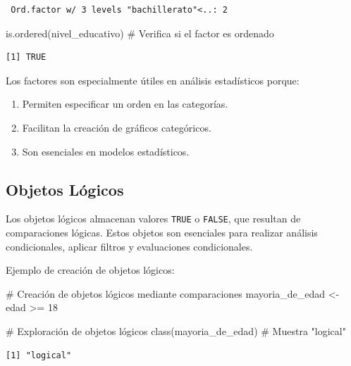 \documentclass[
  spanish,
  a4paper,
  DIV=11,
  numbers=noendperiod,
  onepage,
  openany]{scrreprt}
\newenvironment{Shaded}{\begin{snugshade}}{\end{snugshade}}
\newcommand{\CommentTok}[1]{\textcolor[rgb]{0.37,0.37,0.37}{#1}}
\newcommand{\DecValTok}[1]{\textcolor[rgb]{0.68,0.00,0.00}{#1}}
\newcommand{\FunctionTok}[1]{\textcolor[rgb]{0.28,0.35,0.67}{#1}}
\newcommand{\NormalTok}[1]{\textcolor[rgb]{0.00,0.23,0.31}{#1}}
\newcommand{\OtherTok}[1]{\textcolor[rgb]{0.00,0.23,0.31}{#1}}
\newcommand{\SpecialCharTok}[1]{\textcolor[rgb]{0.37,0.37,0.37}{#1}}
\begin{document}
\begin{verbatim}
 Ord.factor w/ 3 levels "bachillerato"<..: 2
\end{verbatim}

\begin{Shaded}
\begin{Highlighting}[]
\FunctionTok{is.ordered}\NormalTok{(nivel\_educativo)  }\CommentTok{\# Verifica si el factor es ordenado}
\end{Highlighting}
\end{Shaded}

\begin{verbatim}
[1] TRUE
\end{verbatim}

Los factores son especialmente útiles en análisis estadísticos porque:

\begin{enumerate}
\def\labelenumi{\arabic{enumi}.}
\item
  Permiten especificar un orden en las categorías.
\item
  Facilitan la creación de gráficos categóricos.
\item
  Son esenciales en modelos estadísticos.
\end{enumerate}

\subsection{Objetos Lógicos}\label{objetos-luxf3gicos}

Los objetos lógicos almacenan valores \texttt{TRUE} o \texttt{FALSE},
que resultan de comparaciones lógicas. Estos objetos son esenciales para
realizar análisis condicionales, aplicar filtros y evaluaciones
condicionales.

Ejemplo de creación de objetos lógicos:

\begin{Shaded}
\begin{Highlighting}[]
\CommentTok{\# Creación de objetos lógicos mediante comparaciones}
\NormalTok{mayoria\_de\_edad }\OtherTok{\textless{}{-}}\NormalTok{ edad }\SpecialCharTok{\textgreater{}=} \DecValTok{18}


\CommentTok{\# Exploración de objetos lógicos}
\FunctionTok{class}\NormalTok{(mayoria\_de\_edad)   }\CommentTok{\# Muestra "logical"}
\end{Highlighting}
\end{Shaded}

\begin{verbatim}
[1] "logical"
\end{verbatim}
\end{document}
